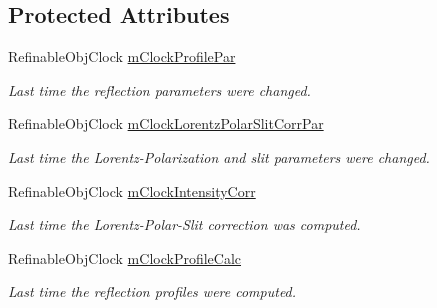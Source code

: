 \subsection*{Protected Attributes}
\begin{DoxyCompactItemize}
\item 
\mbox{\label{class_obj_cryst_1_1_powder_pattern_diffraction_a509b94e52b44aed53752cdf92be7603c}} 
Refinable\+Obj\+Clock \mbox{\hyperlink{class_obj_cryst_1_1_powder_pattern_diffraction_a509b94e52b44aed53752cdf92be7603c}{m\+Clock\+Profile\+Par}}
\begin{DoxyCompactList}\small\item\em Last time the reflection parameters were changed. \end{DoxyCompactList}\item 
\mbox{\label{class_obj_cryst_1_1_powder_pattern_diffraction_a1381bf49f3c4900f0e280f8bcbff172f}} 
Refinable\+Obj\+Clock \mbox{\hyperlink{class_obj_cryst_1_1_powder_pattern_diffraction_a1381bf49f3c4900f0e280f8bcbff172f}{m\+Clock\+Lorentz\+Polar\+Slit\+Corr\+Par}}
\begin{DoxyCompactList}\small\item\em Last time the Lorentz-\/\+Polarization and slit parameters were changed. \end{DoxyCompactList}\item 
\mbox{\label{class_obj_cryst_1_1_powder_pattern_diffraction_ad963323e1ffbdadc9c7bd1cdbf9539dc}} 
Refinable\+Obj\+Clock \mbox{\hyperlink{class_obj_cryst_1_1_powder_pattern_diffraction_ad963323e1ffbdadc9c7bd1cdbf9539dc}{m\+Clock\+Intensity\+Corr}}
\begin{DoxyCompactList}\small\item\em Last time the Lorentz-\/\+Polar-\/\+Slit correction was computed. \end{DoxyCompactList}\item 
\mbox{\label{class_obj_cryst_1_1_powder_pattern_diffraction_a39aa20a66d5c032083f96b96fe3f10d3}} 
Refinable\+Obj\+Clock \mbox{\hyperlink{class_obj_cryst_1_1_powder_pattern_diffraction_a39aa20a66d5c032083f96b96fe3f10d3}{m\+Clock\+Profile\+Calc}}
\begin{DoxyCompactList}\small\item\em Last time the reflection profiles were computed. \end{DoxyCompactList}\item 

\end{DoxyCompactItemize}
